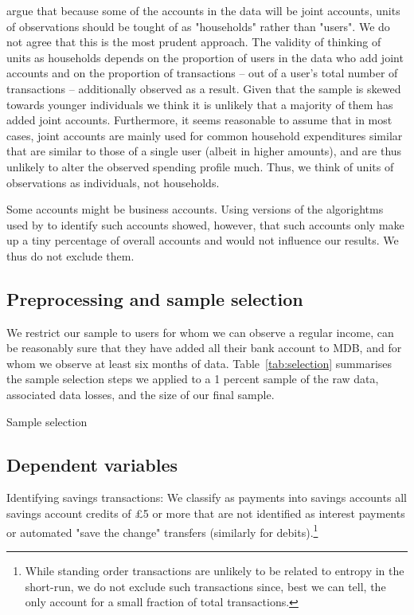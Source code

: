 \citet{bourquin2020effects} argue that because some of the accounts in the data
will be joint accounts, units of observations should be tought of as
"households" rather than "users". We do not agree that this is the most prudent
approach. The validity of thinking of units as households depends on the
proportion of users in the data who add joint accounts and on the proportion of
transactions -- out of a user's total number of transactions -- additionally
observed as a result. Given that the sample is skewed towards younger
individuals we think it is unlikely that a majority of them has added joint
accounts. Furthermore, it seems reasonable to assume that in most cases, joint
accounts are mainly used for common household expenditures similar that are
similar to those of a single user (albeit in higher amounts), and are thus
unlikely to alter the observed spending profile much. Thus, we think of units
of observations as individuals, not households. 

Some accounts might be business accounts. Using versions of the algorightms
used by \citet{bourquin2020effects} to identify such accounts showed, however,
that such accounts only make up a tiny percentage of overall accounts and would
not influence our results. We thus do not exclude them.


\subsection{Preprocessing and sample selection}%
\label{par:preprocessing_and_sample_selection}

We restrict our sample to users for whom we can observe a regular income, can
be reasonably sure that they have added all their bank account to MDB, and for
whom we observe at least six months of data. Table~\ref{tab:selection}
summarises the sample selection steps we applied to a 1 percent sample of the
raw data, associated data losses, and the size of our final sample.

\begin{table}[H]
\centering
\caption{Sample selection}\label{tab:selection}

\end{table}


\subsection{Dependent variables}
\label{sub:dependent_variables}

Identifying savings transactions: We classify as payments into savings accounts
all savings account credits of \pounds5 or more that are not identified as
interest payments or automated "save the change" transfers (similarly for
debits).\footnote{While standing order transactions are unlikely to be related
to entropy in the short-run, we do not exclude such transactions since, best we
can tell, the only account for a small fraction of total transactions.} 

